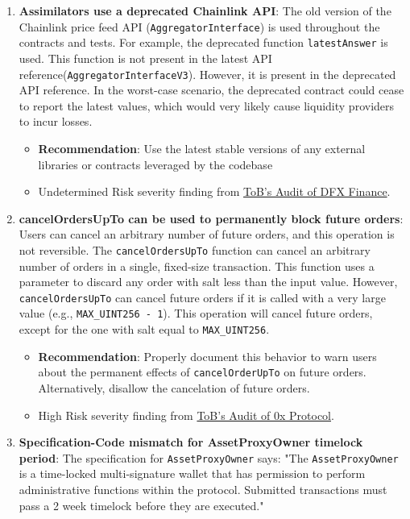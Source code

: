 \begin{enumerate}
\item\textbf{Assimilators use a deprecated Chainlink API}: The old version of the Chainlink price feed API (\verb|AggregatorInterface|) is used throughout the contracts and tests. For example, the deprecated function \verb|latestAnswer| is used. This function is not present in the latest API reference\linebreak(\verb|AggregatorInterfaceV3|). However, it is present in the deprecated API reference. In the worst-case scenario, the deprecated contract could cease to report the latest values, which would very likely cause liquidity providers to incur losses.
	\begin{itemize}
	\item\textbf{Recommendation}: Use the latest stable versions of any external libraries or contracts leveraged by the codebase
	\item Undetermined Risk severity finding from \href{https://github.com/dfx-finance/protocol/blob/main/audits/2021-05-03-Trail_of_Bits.pdf}{ToB’s Audit of DFX Finance}.
	\end{itemize}

\item\textbf{cancelOrdersUpTo can be used to permanently block future orders}: Users can cancel an arbitrary number of future orders, and this operation is not reversible. The \verb|cancelOrdersUpTo| function can cancel an arbitrary number of orders in a single, fixed-size transaction. This function uses a parameter to discard any order with salt less than the input value. However, \verb|cancelOrdersUpTo| can cancel future orders if it is called with a very large value (e.g., \verb|MAX_UINT256 - 1|). This operation will cancel future orders, except for the one with salt equal to \verb|MAX_UINT256|.
	\begin{itemize}
	\item\textbf{Recommendation}: Properly document this behavior to warn users about the permanent effects of \verb|cancelOrderUpTo| on future orders. Alternatively, disallow the cancelation of future orders.
	\item High Risk severity finding from \href{https://github.com/trailofbits/publications/blob/master/reviews/0x-protocol.pdf}{ToB’s Audit of 0x Protocol}.
	\end{itemize}

\item\textbf{Specification-Code mismatch for AssetProxyOwner timelock period}: The specification for \verb|AssetProxyOwner| says: "The \verb|AssetProxyOwner| is a time-locked multi-signature wallet that has permission to perform administrative functions within the protocol. Submitted transactions must pass a 2 week timelock before they are executed."


\end{enumerate}
